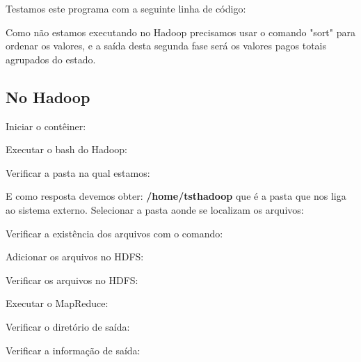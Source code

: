 \documentclass[a4paper,11pt]{article}
\begin{document}
Testamos este programa com a seguinte linha de código: \\

Como não estamos executando no Hadoop precisamos usar o comando "sort" para ordenar os valores, e a saída desta segunda fase será os valores pagos totais agrupados do estado.

\subsection{No Hadoop}
Iniciar o contêiner: \\

Executar o bash do Hadoop: \\

Verificar a pasta na qual estamos: \\

E como resposta devemos obter: \textbf{/home/tsthadoop} que é a pasta que nos liga ao sistema externo. Selecionar a pasta aonde se localizam os arquivos: \\

Verificar a existência dos arquivos com o comando: \\

Adicionar os arquivos no HDFS: \\

Verificar os arquivos no HDFS: \\

Executar o MapReduce: \\

Verificar o diretório de saída: \\

Verificar a informação de saída: \\
\end{document}
